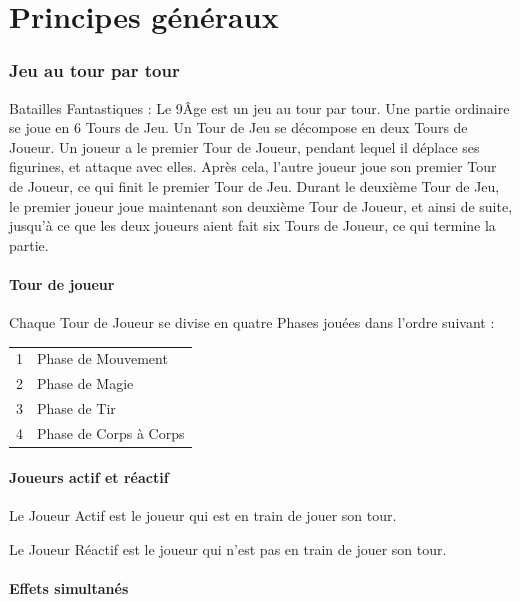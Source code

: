 
\part{Principes généraux}

\section{Jeu au tour par tour}

Batailles Fantastiques : Le 9\ieme Âge est un jeu au tour par tour. Une partie ordinaire se joue en 6 Tours de Jeu. Un Tour de Jeu se décompose en deux Tours de Joueur. Un joueur a le premier Tour de Joueur, pendant lequel il déplace ses figurines, et attaque avec elles. Après cela, l'autre joueur joue son premier Tour de Joueur, ce qui finit le premier Tour de Jeu. Durant le deuxième Tour de Jeu, le premier joueur joue maintenant son deuxième Tour de Joueur, et ainsi de suite, jusqu'à ce que les deux joueurs aient fait six Tours de Joueur, ce qui termine la partie.

\subsection{Tour de joueur}

Chaque Tour de Joueur se divise en quatre Phases jouées dans l'ordre suivant :

\hspace*{0.3cm}
\begin{tabular}{c|l}
1 & Phase de Mouvement \tabularnewline
2 & Phase de Magie \tabularnewline
3 & Phase de Tir \tabularnewline
4 & Phase de Corps à Corps \tabularnewline
\end{tabular}

\subsection{Joueurs actif et réactif}

Le Joueur Actif est le joueur qui est en train de jouer son tour.

Le Joueur Réactif est le joueur qui n'est pas en train de jouer son tour.

\subsection{Effets simultanés}

